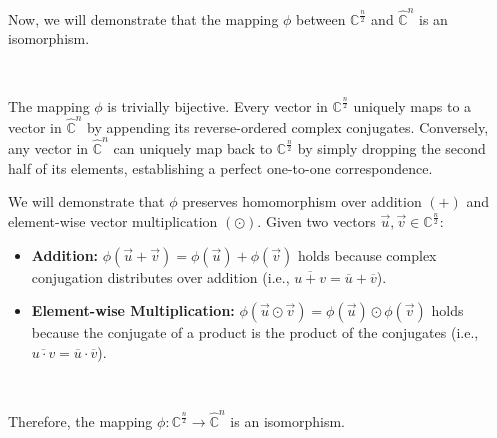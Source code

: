 Now, we will demonstrate that the mapping $\phi$ between $\mathbb{C}^{\frac{n}{2}}$ and $\hat{\mathbb{C}}^{n}$ is an isomorphism.


$ $

 The mapping $\phi$ is trivially bijective. Every vector in $\mathbb{C}^{\frac{n}{2}}$ uniquely maps to a vector in $\hat{\mathbb{C}}^{n}$ by appending its reverse-ordered complex conjugates. Conversely, any vector in $\hat{\mathbb{C}}^{n}$ can uniquely map back to $\mathbb{C}^{\frac{n}{2}}$ by simply dropping the second half of its elements, establishing a perfect one-to-one correspondence.

 We will demonstrate that $\phi$ preserves homomorphism over addition $(+)$ and element-wise vector multiplication $(\odot)$. Given two vectors $\vec{u}, \vec{v} \in \mathbb{C}^{\frac{n}{2}}$:
\begin{itemize}
    \item \textbf{Addition:} $\phi(\vec{u} + \vec{v}) = \phi(\vec{u}) + \phi(\vec{v})$ holds because complex conjugation distributes over addition (i.e., $\overline{u + v} = \overline{u} + \overline{v}$).
    \item \textbf{Element-wise Multiplication:} $\phi(\vec{u} \odot \vec{v}) = \phi(\vec{u}) \odot \phi(\vec{v})$ holds because the conjugate of a product is the product of the conjugates (i.e., $\overline{u \cdot v} = \overline{u} \cdot \overline{v}$).
\end{itemize}

$ $

Therefore, the mapping $\phi: \mathbb{C}^{\frac{n}{2}} \rightarrow \hat{\mathbb{C}}^{n}$ is an isomorphism.

